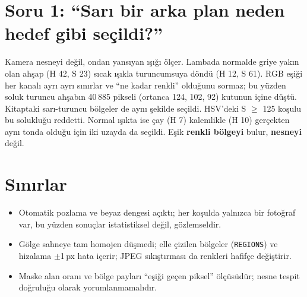 \documentclass[9pt,a4paper]{extarticle}
\newcommand{\kod}[1]{\texttt{\small #1}}
\begin{document}
\section*{Soru 1: ``Sarı bir arka plan neden hedef gibi seçildi?''}
Kamera nesneyi değil, ondan yansıyan ışığı ölçer. Lambada normalde griye yakın olan ahşap (H 42, S 23) sıcak ışıkla turuncumsuya döndü (H 12, S 61).
RGB eşiği her kanalı ayrı ayrı sınırlar ve ``ne kadar renkli'' olduğunu sormaz; bu yüzden soluk turuncu ahşabın 40\,885 pikseli (ortanca 124, 102, 92) kutunun içine düştü. Kitaptaki sarı-turuncu bölgeler de aynı şekilde seçildi. HSV'deki S $\geq$ 125 koşulu bu solukluğu reddetti.
Normal ışıkta ise çay (H 7) kalemlikle (H 10) gerçekten aynı tonda olduğu için iki uzayda da seçildi. Eşik \textbf{renkli bölgeyi} bulur, \textbf{nesneyi} değil.

\section*{Sınırlar}
\begin{itemize}
\item Otomatik pozlama ve beyaz dengesi açıktı; her koşulda yalnızca bir fotoğraf var, bu yüzden sonuçlar istatistiksel değil, gözlemseldir.
\item Gölge sahneye tam homojen düşmedi; elle çizilen bölgeler (\kod{REGIONS}) ve hizalama $\pm$1\,px hata içerir; JPEG sıkıştırması da renkleri hafifçe değiştirir.
\item Maske alan oranı ve bölge payları ``eşiği geçen piksel'' ölçüsüdür; nesne tespit doğruluğu olarak yorumlanmamalıdır.
\end{itemize}

\newpage
\end{document}
